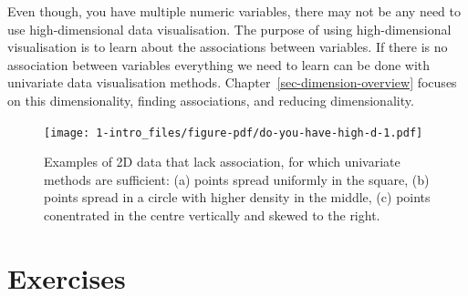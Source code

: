 \documentclass[
  letterpaper,
]{krantz}
\begin{document}
Even though, you have multiple numeric variables, there may not be any
need to use high-dimensional data visualisation. The purpose of using
high-dimensional visualisation is to learn about the associations
between variables. If there is no association between variables
everything we need to learn can be done with univariate data
visualisation methods. Chapter~\ref{sec-dimension-overview} focuses on
this dimensionality, finding associations, and reducing dimensionality.

\begin{figure}[H]

{\centering \texttt{[image: 1-intro\_files/figure-pdf/do-you-have-high-d-1.pdf]}

}

\caption{Examples of 2D data that lack association, for which univariate
methods are sufficient: (a) points spread uniformly in the square, (b)
points spread in a circle with higher density in the middle, (c) points
conentrated in the centre vertically and skewed to the right.}

\end{figure}%

\section*{Exercises}\label{exercises}

\end{document}
